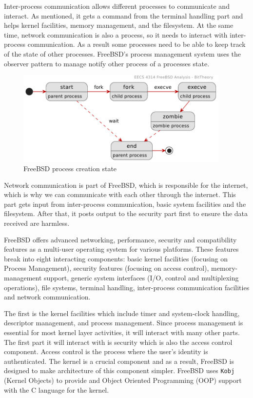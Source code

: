 \documentclass[12pt, dvipsnames, a4paper]{article}
\newcommand{\code}[1]{\texttt{#1}}
\begin{document}
Inter-process communication allows different processes to communicate and interact. As mentioned, it gets a command from the terminal handling part and helps kernel facilities, memory management, and the filesystem. At the same time, network communication is also a process, so it needs to interact with inter-process communication. As a result some processes need to be able to keep track of the state of other processes. FreeBSD's process management system uses the observer pattern to manage notify other process of a processes state.
\begin{figure}[!htb]
	\centering
	\includegraphics[width = 300pt]{assets/state_diagrams/process-state.pdf}
	\caption{FreeBSD process creation state}
\end{figure}

Network communication is part of FreeBSD, which is responsible for the internet, which is why we can communicate with each other through the internet. This part gets input from inter-process communication, basic system facilities and the filesystem. After that, it posts output to the security part first to ensure the data received are harmless.

FreeBSD offers advanced networking, performance, security and compatibility features as a multi-user operating system for various platforms. These features break into eight interacting components: basic kernel facilities (focusing on Process Management), security features
(focusing on access control), memory-management support, generic system interfaces (I/O, control and multiplexing operations), file systems, terminal handling, inter-process communication facilities and network communication.

The first is the kernel facilities which include timer and system-clock handling, descriptor management, and process management. Since process management is essential for most kernel layer activities, it will interact with many other parts. The first part it will interact with
is security which is also the access control component. Access control is the process where the user's identity is authenticated. The kernel is a crucial component and as a result, FreeBSD is designed to make architecture of this component simpler. FreeBSD uses \code{Kobj} (Kernel Objects) to provide and Object Oriented Programming (OOP) support with the C language for the kernel.
\end{document}
